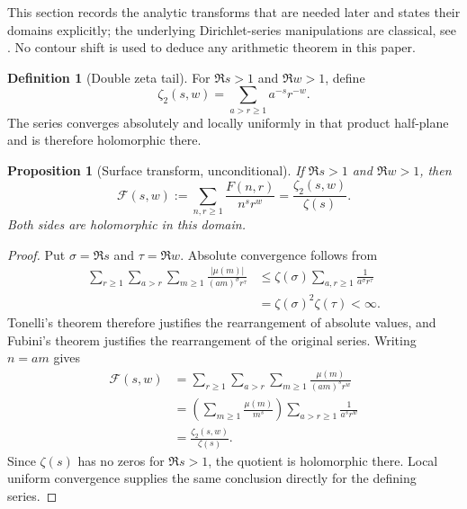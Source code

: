 \documentclass[11pt]{amsart}
\numberwithin{equation}{section}
\theoremstyle{plain}
\newtheorem{proposition}[theorem]{Proposition}
\theoremstyle{definition}
\newtheorem{definition}[theorem]{Definition}
\theoremstyle{remark}
\newcommand{\mob}{\mu}
\newcommand{\Fsurf}{F}
\begin{document}
This section records the analytic transforms that are needed later and states their domains explicitly; the underlying Dirichlet-series manipulations are classical, see \cite{Apostol1976}.  No contour shift is used to deduce any arithmetic theorem in this paper.

\begin{definition}[Double zeta tail]
\label{def:zeta2}
For $\Re s>1$ and $\Re w>1$, define
\begin{equation}
\zeta_2(s,w)=\sum_{a>r\ge1}a^{-s}r^{-w}.
\label{eq:zeta2_definition}
\end{equation}
The series converges absolutely and locally uniformly in that product half-plane and is therefore holomorphic there.
\end{definition}

\begin{proposition}[Surface transform, unconditional]
\label{prop:surface_transform}
If $\Re s>1$ and $\Re w>1$, then
\begin{equation}
\mathscr F(s,w)
:=\sum_{n,r\ge1}\frac{\Fsurf(n,r)}{n^s r^w}
=\frac{\zeta_2(s,w)}{\zeta(s)}.
\label{eq:surface_transform}
\end{equation}
Both sides are holomorphic in this domain.
\end{proposition}

\begin{proof}
Put $\sigma=\Re s$ and $\tau=\Re w$.  Absolute convergence follows from
\begin{align}
\sum_{r\ge1}\sum_{a>r}\sum_{m\ge1}
\frac{|\mob(m)|}{(am)^\sigma r^\tau}
&\le \zeta(\sigma)\sum_{a,r\ge1}\frac1{a^\sigma r^\tau}
\label{eq:surface_absolute_bound}\\
&=\zeta(\sigma)^2\zeta(\tau)<\infty.
\label{eq:surface_absolute_bound_final}
\end{align}
Tonelli's theorem therefore justifies the rearrangement of absolute values, and Fubini's theorem justifies the rearrangement of the original series.  Writing $n=am$ gives
\begin{align}
\mathscr F(s,w)
&=\sum_{r\ge1}\sum_{a>r}\sum_{m\ge1}
\frac{\mob(m)}{(am)^s r^w}
\label{eq:surface_transform_expand}\\
&=\left(\sum_{m\ge1}\frac{\mob(m)}{m^s}\right)
\sum_{a>r\ge1}\frac1{a^s r^w}
\label{eq:surface_transform_factor}\\
&=\frac{\zeta_2(s,w)}{\zeta(s)}.
\label{eq:surface_transform_finish}
\end{align}
Since $\zeta(s)$ has no zeros for $\Re s>1$, the quotient is holomorphic there.  Local uniform convergence supplies the same conclusion directly for the defining series.
\end{proof}
\end{document}
